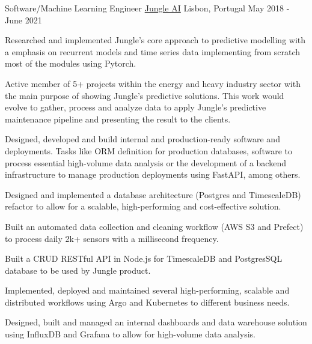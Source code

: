 \begin{cventries}
  \cventry
    {Software/Machine Learning Engineer} %
    {\href{https://www.jungle.ai}{Jungle AI}} %
    {Lisbon, Portugal} %
    {May 2018 - June 2021} %
    {
      \begin{cvitems} %
        \item {Researched and implemented Jungle’s core approach to predictive modelling with a emphasis on recurrent models and time series data implementing from scratch most of the modules using Pytorch.}
        \item {Active member of 5+ projects within the energy and heavy industry sector with the main purpose of showing Jungle’s predictive solutions. This work would evolve to gather, process and analyze data to apply Jungle's predictive maintenance pipeline and presenting the result to the clients.}
        \item {Designed, developed and build internal and production-ready software and deployments. Tasks like ORM definition for production databases, software to process essential high-volume data analysis or the development of a backend infrastructure to manage production deployments using FastAPI, among others.}
        \item {Designed and implemented a database architecture (Postgres and TimescaleDB) refactor to allow for a scalable, high-performing and cost-effective solution.}
        \item {Built an automated data collection and cleaning workflow (AWS S3 and Prefect) to process daily 2k+ sensors with a millisecond frequency.}
        \item {Built a CRUD RESTful API in Node.js for TimescaleDB and PostgresSQL database to be used by Jungle product.}
        \item {Implemented, deployed and maintained several high-performing, scalable and distributed workflows using Argo and Kubernetes to different business needs.}
        \item {Designed, built and managed an internal dashboards and data warehouse solution using InfluxDB and Grafana to allow for high-volume data analysis.}
      \end{cvitems}
    }


\end{cventries}
